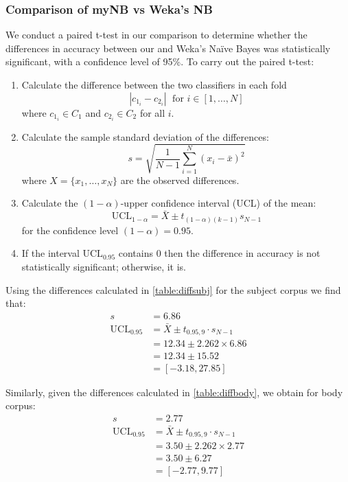 \documentclass[10pt, a4paper]{article}
\begin{document}
\subsubsection{Comparison of myNB vs Weka's NB}

We conduct a paired t-test in our comparison to determine whether the differences in accuracy between our and Weka's Na\"ive Bayes was statistically significant, with a confidence level of 95\%. To carry out the paired t-test:

\begin{enumerate}
\item Calculate the difference between the two classifiers in each fold
$$ | c_{1_i} - c_{2_i} | \; \text{ for } i \in [1,\dots,N] $$
where $c_{1_i} \in C_1$ and $c_{2_i} \in C_2$ for all $i$.

\item Calculate the sample standard deviation of the differences:
$$ s = \sqrt{ \frac{1}{N-1} \sum_{i=1}^N (x_i-\bar{x})^2 } $$
where $X=\{ x_1,\dots,x_N \}$ are the observed differences.

\item Calculate the $(1-\alpha)$-upper confidence interval (UCL) of the mean:
$$ \text{UCL}_{1-\alpha} = \bar{X} \pm t_{(1-\alpha)(k-1)} s_{N-1} $$
for the confidence level $(1-\alpha)=0.95$.

\item If the interval $\text{UCL}_{0.95}$ contains 0 then the difference in accuracy is not statistically significant; otherwise, it is.
\end{enumerate}

Using the differences calculated in \autoref{table:diffsubj} for the subject corpus we find that:
\begin{align*}
s &= 6.86 \\
\text{UCL}_{0.95} &= \bar{X} \pm t_{0.95,9} \cdot s_{N-1} \\
  &= 12.34 \pm 2.262 \times 6.86 \\ 
  &= 12.34 \pm 15.52 \\
  &= [-3.18, 27.85]
\end{align*}

Similarly, given the differences calculated in \autoref{table:diffbody}, we obtain for body corpus:
\begin{align*}
s &= 2.77 \\
\text{UCL}_{0.95} &= \bar{X} \pm t_{0.95,9} \cdot s_{N-1} \\
  &= 3.50 \pm 2.262 \times 2.77 \\ 
  &= 3.50 \pm 6.27 \\
  &= [-2.77, 9.77]
\end{align*}
\end{document}
